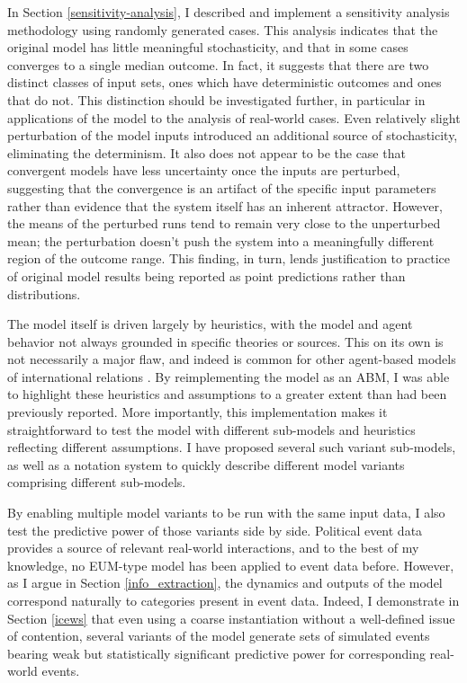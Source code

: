 In Section \ref{sensitivity-analysis}, I described and implement a sensitivity analysis methodology using randomly generated cases. This analysis indicates that the original model has little meaningful stochasticity, and that in some cases converges to a single median outcome. In fact, it suggests that there are two distinct classes of input sets, ones which have deterministic outcomes and ones that do not. This distinction should be investigated further, in particular in applications of the model to the analysis of real-world cases. Even relatively slight perturbation of the model inputs introduced an additional source of stochasticity, eliminating the determinism. It also does not appear to be the case that convergent models have less uncertainty once the inputs are perturbed, suggesting that the convergence is an artifact of the specific input parameters rather than evidence that the system itself has an inherent attractor. However, the means of the perturbed runs tend to remain very close to the unperturbed mean; the perturbation doesn't push the system into a meaningfully different region of the outcome range. This finding, in turn, lends justification to practice of original model results being reported as point predictions rather than distributions.

The model itself is driven largely by heuristics, with the model and agent behavior not always grounded in specific theories or sources. This on its own is not necessarily a major flaw, and indeed is common for other agent-based models of international relations \citep[e.g.][]{axelrod_1997,taylor_2008}. By reimplementing the model as an ABM, I was able to highlight these heuristics and assumptions to a greater extent than had been previously reported. More importantly, this implementation makes it straightforward to test the model with different sub-models and heuristics reflecting different assumptions. I have proposed several such variant sub-models, as well as a notation system to quickly describe different model variants comprising different sub-models.

By enabling multiple model variants to be run with the same input data, I also test the predictive power of those variants side by side. Political event data provides a source of relevant real-world interactions, and to the best of my knowledge, no EUM-type model has been applied to event data before. However, as I argue in Section \ref{info_extraction}, the dynamics and outputs of the model correspond naturally to categories present in event data. Indeed, I demonstrate in Section \ref{icews} that even using a coarse instantiation without a well-defined issue of contention, several variants of the model generate sets of simulated events bearing weak but statistically significant predictive power for corresponding real-world events. 

